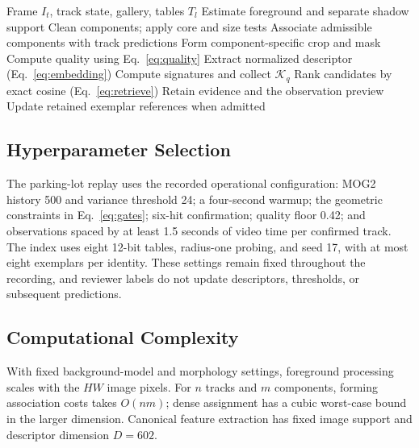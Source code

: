 \documentclass[conference]{IEEEtran}
\begin{document}
\begin{algorithm}[t]
\caption{Visual observation and indexed retrieval}
\label{alg:pipeline}
\begin{algorithmic}[1]
\REQUIRE Frame $I_t$, track state, gallery, tables $T_l$
\STATE Estimate foreground and separate shadow support
\STATE Clean components; apply core and size tests
\STATE Associate admissible components with track predictions
\STATE Form component-specific crop and mask
\STATE Compute quality using Eq.~\eqref{eq:quality}
\STATE Extract normalized descriptor (Eq.~\eqref{eq:embedding})
\STATE Compute signatures and collect $\mathcal K_q$
\STATE Rank candidates by exact cosine (Eq.~\eqref{eq:retrieve})
\STATE Retain evidence and the observation preview
\STATE Update retained exemplar references when admitted
\ENDIF
\ENDFOR
\end{algorithmic}
\end{algorithm}

\subsection{Hyperparameter Selection}
The parking-lot replay uses the recorded operational configuration: MOG2 history 500 and variance threshold 24; a four-second warmup; the geometric constraints in Eq.~\eqref{eq:gates}; six-hit confirmation; quality floor 0.42; and observations spaced by at least 1.5 seconds of video time per confirmed track. The index uses eight 12-bit tables, radius-one probing, and seed 17, with at most eight exemplars per identity. These settings remain fixed throughout the recording, and reviewer labels do not update descriptors, thresholds, or subsequent predictions.

\subsection{Computational Complexity}
With fixed background-model and morphology settings, foreground processing scales with the $HW$ image pixels. For $n$ tracks and $m$ components, forming association costs takes $O(nm)$; dense assignment has a cubic worst-case bound in the larger dimension. Canonical feature extraction has fixed image support and descriptor dimension $D=602$.
\end{document}
